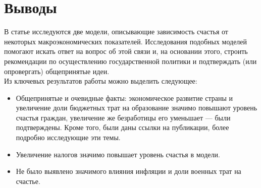 \documentclass[russian]{vegareport}
\begin{document}
    
    \chapter{Выводы}
        В статье исследуются две модели, описывающие зависимость счастья от некоторых макроэкономических показателей.
         Исследования подобных моделей помогают искать ответ на вопрос об этой связи и, на основании этого, 
         строить рекомендации по осуществлению государственной политики и подтверждать (или опровергать) общепринятые идеи.
        \\
        Из ключевых результатов работы можно выделить следующее:
        \begin{itemize}
            \item Общепринятые и очевидные факты: экономическое развитие страны и увеличение доли бюджетных 
            трат на образование значимо повышают уровень счастья граждан, увеличение же безработицы его уменьшает --- 
            были подтверждены. Кроме того, были даны ссылки на публикации, более подробно исследующие эти темы.
            \item Увеличение налогов значимо повышает уровень счастья в модели.
            \item Не было выявлено значимого влияния инфляции и доли военных трат на счастье.
        \end{itemize}
        
\end{document}
